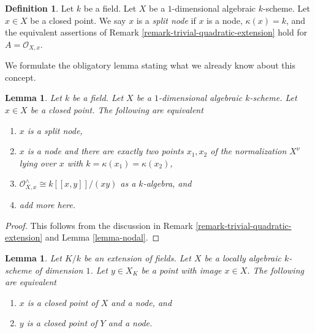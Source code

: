\documentclass{stacks-project}
\theoremstyle{plain}
\newtheorem{lemma}[subsection]{Lemma}
\theoremstyle{definition}
\newtheorem{definition}[subsection]{Definition}
\theoremstyle{remark}
\numberwithin{equation}{subsection}
\begin{document}
\begin{definition}
\label{definition-split-node}
Let $k$ be a field. Let $X$ be a $1$-dimensional algebraic $k$-scheme.
Let $x \in X$ be a closed point. We say $x$ is a {\it split node}
if $x$ is a node, $\kappa(x) = k$, and the equivalent assertions of
Remark \ref{remark-trivial-quadratic-extension}
hold for $A = \mathcal{O}_{X, x}$.
\end{definition}

\noindent
We formulate the obligatory lemma stating what we already know
about this concept.

\begin{lemma}
\label{lemma-split-node}
Let $k$ be a field. Let $X$ be a $1$-dimensional algebraic $k$-scheme.
Let $x \in X$ be a closed point. The following are equivalent
\begin{enumerate}
\item $x$ is a split node,
\item $x$ is a node and there are exactly two points $x_1, x_2$
of the normalization $X^\nu$ lying over $x$ with
$k = \kappa(x_1) = \kappa(x_2)$,
\item $\mathcal{O}_{X, x}^\wedge \cong k[[x, y]]/(xy)$ as a $k$-algebra, and
\item add more here.
\end{enumerate}
\end{lemma}

\begin{proof}
This follows from the discussion in
Remark \ref{remark-trivial-quadratic-extension}
and Lemma \ref{lemma-nodal}.
\end{proof}

\begin{lemma}
\label{lemma-node-field-extension}
Let $K/k$ be an extension of fields. Let $X$ be a locally algebraic
$k$-scheme of dimension $1$. Let $y \in X_K$ be a point with image
$x \in X$. The following are equivalent
\begin{enumerate}
\item $x$ is a closed point of $X$ and a node, and
\item $y$ is a closed point of $Y$ and a node.
\end{enumerate}
\end{lemma}
\end{document}
